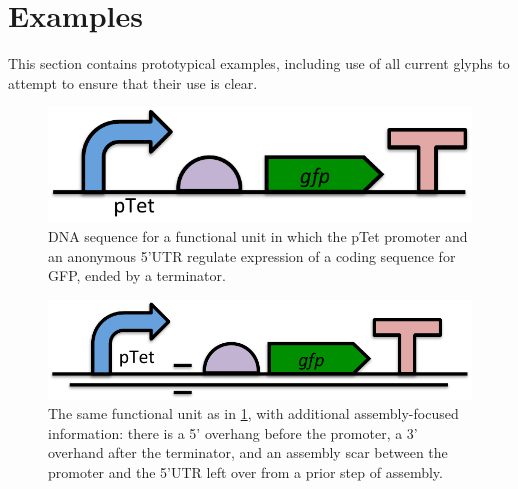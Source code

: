 \section{Examples}\label{sec:examples}


This section contains prototypical examples, including use of all
current glyphs to attempt to ensure that their use is clear.

\begin{figure}[h!]
\includegraphics[scale=0.5]{figures/apdx-examples/apdx-exa1.pdf}
\caption{DNA sequence for a functional unit in which the pTet promoter and an anonymous 5'UTR regulate expression of a coding sequence for GFP, ended by a terminator.}
\label{f:apdx:exa1}
\end{figure}

\begin{figure}[h!]
\includegraphics[scale=0.5]{figures/apdx-examples/apdx-exa2.pdf}
\caption{The same functional unit as in \ref{f:apdx:exa1}, with additional assembly-focused information: there is a 5' overhang before the promoter, a 3' overhand after the terminator, and an assembly scar between the promoter and the 5'UTR left over from a prior step of assembly.}
\label{f:apdx:exa2}
\end{figure}


